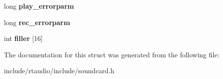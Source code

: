 \begin{DoxyCompactItemize}
\item 
long {\bfseries play\+\_\+errorparm}\hypertarget{structaudio__errinfo_a61df85ce4cb80f11bf7a77b330650ba6}{}\label{structaudio__errinfo_a61df85ce4cb80f11bf7a77b330650ba6}

\item 
long {\bfseries rec\+\_\+errorparm}\hypertarget{structaudio__errinfo_a82204c5e3f03bfd9fe2055e93daa83b0}{}\label{structaudio__errinfo_a82204c5e3f03bfd9fe2055e93daa83b0}

\item 
int {\bfseries filler} \mbox{[}16\mbox{]}\hypertarget{structaudio__errinfo_a71d1016ac48d709ec4b8d15fb19d740b}{}\label{structaudio__errinfo_a71d1016ac48d709ec4b8d15fb19d740b}

\end{DoxyCompactItemize}


The documentation for this struct was generated from the following file\+:\begin{DoxyCompactItemize}
\item 
include/rtaudio/include/soundcard.\+h\end{DoxyCompactItemize}
